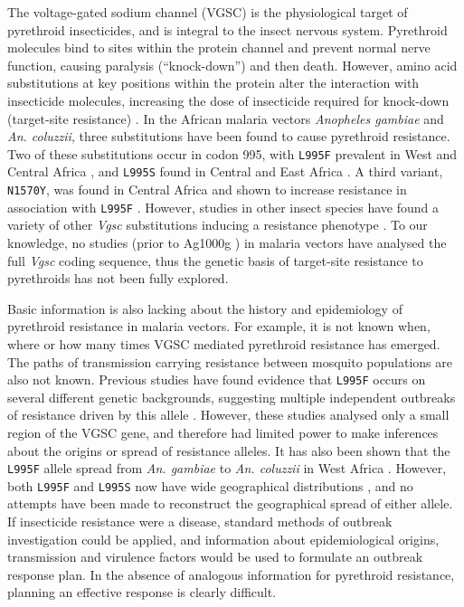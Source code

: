 \documentclass[a4paper,11pt,abstracton,hidelinks]{scrartcl}
\begin{document}
The voltage-gated sodium channel (VGSC) is the physiological target of pyrethroid insecticides, and is integral to the insect nervous system. 
%
Pyrethroid molecules bind to sites within the protein channel and prevent normal nerve function, causing paralysis (``knock-down'') and then death. 
%
However, amino acid substitutions at key positions within the protein alter the interaction with insecticide molecules, increasing the dose of insecticide required for knock-down (target-site resistance) \cite{Davies2007a}. 
%
In the African malaria vectors \textit{Anopheles gambiae} and \textit{An. coluzzii}, three substitutions have been found to cause pyrethroid resistance. 
%
Two of these substitutions occur in codon 995\footnotemark, with \texttt{L995F} prevalent in West and Central Africa \cite{Martinez-Torres1998,Silva2014}, and \texttt{L995S} found in Central and East Africa \cite{Ranson2000,Silva2014}. 
%
%
A third variant, \texttt{N1570Y}, was found in Central Africa and shown to increase resistance in association with \texttt{L995F} \cite{Jones2012}.
%
However, studies in other insect species have found a variety of other \emph{Vgsc} substitutions inducing a resistance phenotype \cite{Davies2007b,Rinkevich2013,Dong2014}. 
%
To our knowledge, no studies (prior to Ag1000g \cite{Ag1000gConsortium2017}) in malaria vectors have analysed the full \emph{Vgsc} coding sequence, thus the genetic basis of target-site resistance to pyrethroids has not been fully explored.


Basic information is also lacking about the history and epidemiology of pyrethroid resistance in malaria vectors. 	
%
For example, it is not known when, where or how many times VGSC mediated pyrethroid resistance has emerged. 
%
The paths of transmission carrying resistance between mosquito populations are also not known. 
%
Previous studies have found evidence that \texttt{L995F} occurs on several different genetic backgrounds, suggesting multiple independent outbreaks of resistance driven by this allele \cite{Pinto2007,Etang2009,Santolamazza2015}. 
%
However, these studies analysed only a small region of the VGSC gene, and therefore had limited power to make inferences about the origins or spread of resistance alleles. 
%
It has also been shown that the \texttt{L995F} allele spread from \textit{An. gambiae} to \textit{An. coluzzii} in West Africa \cite{Clarkson2014,Norris2015}. 
%
However, both \texttt{L995F} and \texttt{L995S} now have wide geographical distributions \cite{Silva2014}, and no attempts have been made to reconstruct the geographical spread of either allele. 
%
If insecticide resistance were a disease, standard methods of outbreak investigation could be applied, and information about epidemiological origins, transmission and virulence factors would be used to formulate an outbreak response plan. 
%
In the absence of analogous information for pyrethroid resistance, planning an effective response is clearly difficult.
\end{document}
